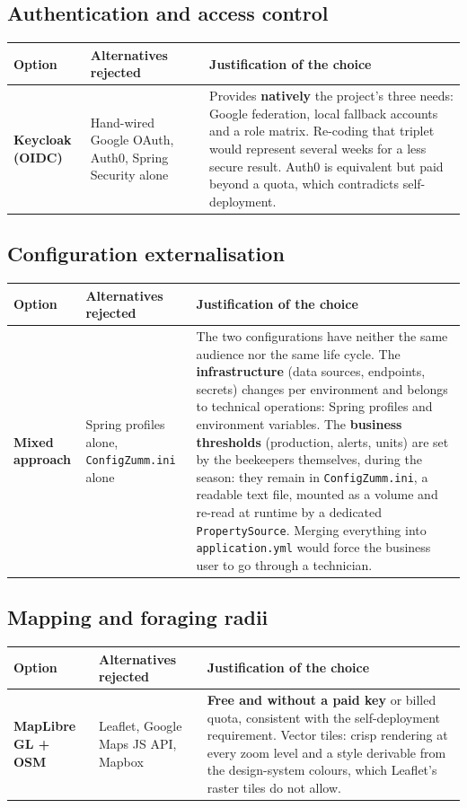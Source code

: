 \subsection{Authentication and access control}
\begin{xltabular}{\textwidth}{>{\bfseries}p{2.7cm} p{4.2cm} X}
\toprule
\textbf{Option} & \textbf{Alternatives rejected} & \textbf{Justification of the choice} \\
\midrule
\endhead
Keycloak (OIDC) & Hand-wired Google OAuth, Auth0, Spring Security alone & Provides \textbf{natively} the project's three needs: Google federation, local fallback accounts and a role matrix. Re-coding that triplet would represent several weeks for a less secure result. Auth0 is equivalent but paid beyond a quota, which contradicts self-deployment. \\
\bottomrule
\end{xltabular}

\subsection{Configuration externalisation}
\begin{xltabular}{\textwidth}{>{\bfseries}p{2.7cm} p{4.2cm} X}
\toprule
\textbf{Option} & \textbf{Alternatives rejected} & \textbf{Justification of the choice} \\
\midrule
\endhead
Mixed approach & Spring profiles alone, \texttt{ConfigZumm.ini} alone & The two configurations have neither the same audience nor the same life cycle. The \textbf{infrastructure} (data sources, endpoints, secrets) changes per environment and belongs to technical operations: Spring profiles and environment variables. The \textbf{business thresholds} (production, alerts, units) are set by the beekeepers themselves, during the season: they remain in \texttt{ConfigZumm.ini}, a readable text file, mounted as a volume and re-read at runtime by a dedicated \texttt{PropertySource}. Merging everything into \texttt{application.yml} would force the business user to go through a technician. \\
\bottomrule
\end{xltabular}

\subsection{Mapping and foraging radii}
\begin{xltabular}{\textwidth}{>{\bfseries}p{2.7cm} p{4.2cm} X}
\toprule
\textbf{Option} & \textbf{Alternatives rejected} & \textbf{Justification of the choice} \\
\midrule
\endhead
MapLibre GL + OSM & Leaflet, Google Maps JS API, Mapbox & \textbf{Free and without a paid key} or billed quota, consistent with the self-deployment requirement. Vector tiles: crisp rendering at every zoom level and a style derivable from the design-system colours, which Leaflet's raster tiles do not allow. \\
\bottomrule
\end{xltabular}

